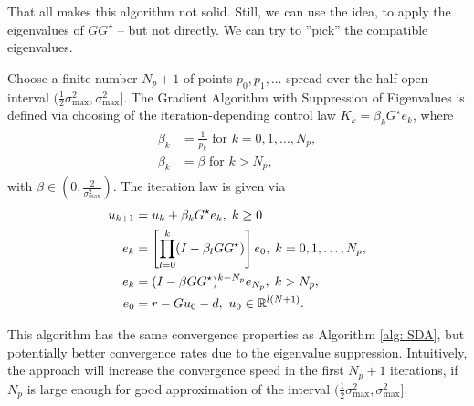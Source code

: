 That all makes this algorithm not solid. Still, we can use the idea, to apply the eigenvalues of $G G^{\star}$ -- but not directly. We can try to ''pick'' the compatible eigenvalues.
\begin{alg}
	Choose a finite number $N_p + 1$ of points $p_0, p_1, \dots$ spread over the half-open interval $(\frac{1}{2}\sigma_{\max}^2, \sigma_{\max}^2]$. 
	The Gradient Algorithm with Suppression of Eigenvalues is defined via choosing of the iteration-depending control law  $K_k = \beta_k G^\star e_k$, where 
	\begin{align}
	\begin{split}
	\beta_k &= \frac{1}{p_k} \text{ for } k = 0 , 1, \dots , N_p,\\
	\beta_k &= \beta  \text{ for } k > N_p,
	\end{split}
	\end{align}
	with $\beta \in (0, \frac{2}{\sigma_{\max}^2})$.
	The iteration law is given via
	\begin{align}
	\begin{split}
	u_{k+1} &= u_k + \beta_k G^\star e_k, \; k\geq 0\\
	e _{k} &= \left[\prod_{l = 0}^k (I - \beta_l  GG^\star) \right] e_{0}, \;  k = 0 , 1, \dots , N_p,\\
	e _{k} &=  (I - \beta GG^\star)^{k - N_p} e_{N_p}, \;  k > N_p, \\
	e_0 &= r -  Gu_0 -d, \text{ } u_0 \in {\mathbb{R}}^{l (N+1)}.
	\end{split}
	\end{align}	
\end{alg}

This algorithm has the same convergence properties as Algorithm \ref{alg: SDA}, but potentially better convergence rates due to the eigenvalue suppression. Intuitively, the approach will increase the convergence speed in the first $N_p + 1$ iterations, if $N_p$ is large enough for good approximation of the interval $(\frac{1}{2} \sigma_{\max}^2, \sigma_{\max}^2]$.

